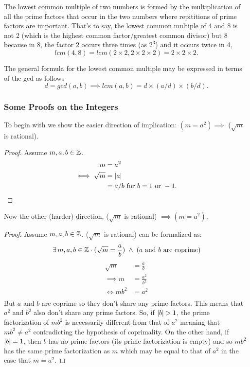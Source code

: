 \documentclass[../MathsNotesBase.tex]{subfiles}
\begin{document}
{		\label{sssec:lowest_common_multiple}
		The lowest common multiple of two numbers is formed by the multiplication of all the prime factors that occur in the two numbers where repititions of prime factors are important. That's to say, the lowest common multiple of 4 and 8 is not 2 (which is the highest common factor/greatest common divisor) but 8 because in 8, the factor 2 occurs three times (as $2^3$) and it occurs twice in 4,
		\[ lcm(4,8) = lcm(2\times2, 2\times2\times2) = 2\times2\times2. \]
		
		The general formula for the lowest common multiple may be expressed in terms of the gcd as follows
		\[ d = gcd(a, b) \implies lcm(a, b) = d \times (a/d) \times (b/d). \]
	
	
		
		\pagebreak
		\subsubsection{Some Proofs on the Integers}\bigskip
	
		To begin with we show the easier direction of implication: $(m = a^2) \implies$ ($\sqrt{m}$ is rational).
		\begin{proof}
		Assume $m,a,b \in \mathbb{Z}^{}$.
		\begin{align*}
		m &= a^2 \\
		\iff \sqrt{m} &= \left\lvert a\right\rvert \\
		&= a/b \text{ for } b = 1 \text{ or } -1. \qedhere
		\end{align*}
		\end{proof}
		Now the other (harder) direction, ($\sqrt{m}$ is rational) $\implies (m = a^2)$.
		\begin{proof}
		Assume $m,a,b \in \mathbb{Z}^{}$. ($\sqrt{m}$ is rational) can be formalized as:
		\[ \exists\,m,a,b \in \mathbb{Z}^{} \cdot (\sqrt{m} = \frac{a}{b}) \; \wedge \; \text{($a$ and $b$ are coprime)} \]
		\begin{align*}
		\sqrt{m} &= \frac{a}{b} \\[8pt]
		\implies m &= \frac{a^2}{b^2} \\[8pt]
		\iff mb^2 &= a^2 \\ 
		\end{align*}
		But $a$ and $b$ are coprime so they don't share any prime factors. This means that $a^2$ and $b^2$ also don't share any prime factors. So, if $\left\lvert b\right\rvert > 1$, the prime factorization of $mb^2$ is necessarily different from that of $a^2$ meaning that $mb^2 \neq a^2$ contradicting the hypothesis of coprimality.
		On the other hand, if $\left\lvert b\right\rvert = 1$, then $b$ has no prime factors (its prime factorization is empty) and so $mb^2$ has the same prime factorization as $m$ which may be equal to that of $a^2$ in the case that $m = a^2$.
		\end{proof}
		\bigskip
		
}
\end{document}
